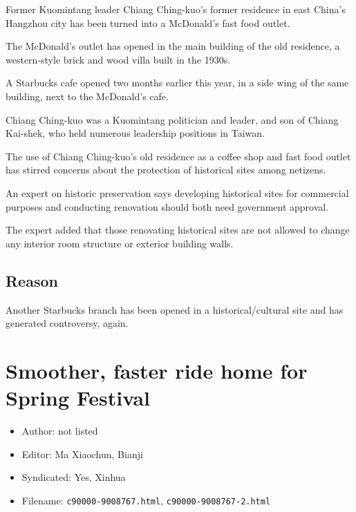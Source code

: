 \begin{displayquote}

	Former Kuomintang leader Chiang Ching-kuo's former residence in east
	China's Hangzhou city has been turned into a McDonald's fast food
	outlet.

	The McDonald's outlet has opened in the main building of the old
	residence, a western-style brick and wood villa built in the 1930s.

	A Starbucks cafe opened two months earlier this year, in a side wing of
	the same building, next to the McDonald's cafe.

	Chiang Ching-kuo was a Kuomintang politician and leader, and son of
	Chiang Kai-shek, who held numerous leadership positions in Taiwan.

	The use of Chiang Ching-kuo's old residence as a coffee shop and fast
	food outlet has stirred concerns about the protection of historical
	sites among netizens.

	An expert on historic preservation says developing historical sites for
	commercial purposes and conducting renovation should both need
	government approval.

	The expert added that those renovating historical sites are not allowed
	to change any interior room structure or exterior building walls.

\end{displayquote}

\subsection{Reason}

Another Starbucks branch has been opened in a historical/cultural site and has
generated controversy, again.

\section{Smoother, faster ride home for Spring Festival}

\begin{itemize}
	\item Author: not listed
	\item Editor: Ma Xiaochun, Bianji
	\item Syndicated: Yes, Xinhua
	\item Filename: \texttt{c90000-9008767.html},
	\texttt{c90000-9008767-2.html}
\end{itemize}

